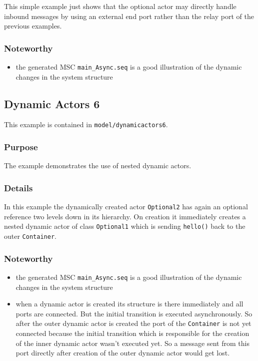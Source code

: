 This simple example just shows that the optional actor may directly handle inbound messages by using an
external end port rather than the relay port of the previous examples.

\subsubsection{Noteworthy}

\begin{itemize}
\item the generated MSC \texttt{main\_Async.seq} is a good illustration of the dynamic changes in the system structure
\end{itemize}

\subsection{Dynamic Actors 6}

This example is contained in \texttt{model/dynamicactors6}.

\subsubsection{Purpose}

The example demonstrates the use of nested dynamic actors.

\subsubsection{Details}

In this example the dynamically created actor \texttt{Optional2} has again an optional reference two levels down in its hierarchy.
On creation it immediately creates a nested dynamic actor of class \texttt{Optional1} which is sending \texttt{hello()} back
to the outer \texttt{Container}.

\subsubsection{Noteworthy}

\begin{itemize}
\item the generated MSC \texttt{main\_Async.seq} is a good illustration of the dynamic changes in the system structure
\item when a dynamic actor is created its structure is there immediately and all ports are connected. But the initial transition
is executed asynchronously. So after the outer dynamic actor is created the port of the \texttt{Container} is not yet connected
because the initial transition which is responsible for the creation of the inner dynamic actor wasn't executed yet.
So a message sent from this port directly after creation of the outer dynamic actor would get lost.
\end{itemize}

